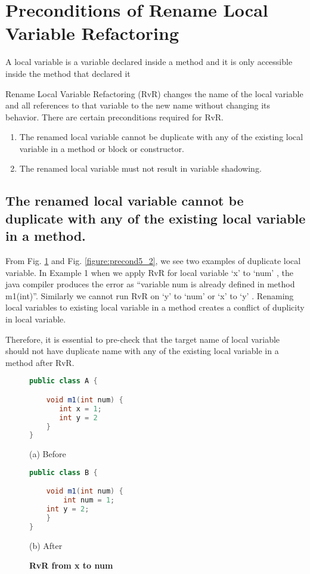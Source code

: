 \section{\textbf{Preconditions of Rename Local Variable Refactoring}}
A local variable is a variable declared inside a method and it is only accessible inside the method that declared it

Rename Local Variable Refactoring (RvR) changes the name of the local variable and all references to that variable to the new name without changing its behavior. There are certain preconditions required for RvR.
\begin{enumerate}
\item The renamed local variable cannot be duplicate with any of the existing local variable in a method or block or constructor.
\item The renamed local variable must not result in variable shadowing.
\end{enumerate}

\subsection{The renamed local variable cannot be duplicate with any of the existing local variable in a method.}
 
From Fig. \ref{figure:precond5_1} and Fig. \ref{figure:precond5_2}, we see two examples of duplicate local variable. In Example 1 when we apply RvR for local variable `x' to `num' , the java compiler produces the error as ``variable num is already defined in method m1(int)''. Similarly we cannot run RvR on  `y'  to `num' or `x'  to `y' . Renaming local variables to existing local variable in a method creates a conflict of duplicity in local variable.

Therefore, it is essential to pre-check that the target name of local variable should not have duplicate name with any of the existing local variable in a method after RvR.

\begin{figure}[th]
\centering
\begin{minipage}[t]{0.45\linewidth}
\begin{lstlisting}[language=java, basicstyle=\scriptsize\ttfamily,frame=single]
public class A {

    void m1(int num) {
       int x = 1; 
       int y = 2
    }
}
\end{lstlisting}
\centering(a) Before
\end{minipage}
\hfill
\begin{minipage}[t]{0.45\linewidth}
\begin{lstlisting}[language=java, basicstyle=\scriptsize\ttfamily,frame=single]
public class B {

    void m1(int num) {
        int num = 1; 
	int y = 2;
    }
}
\end{lstlisting}
\centering(b) After 
\end{minipage}
\caption{\textbf{RvR from x to num}}
\label{figure:precond5_1}
\end{figure}

